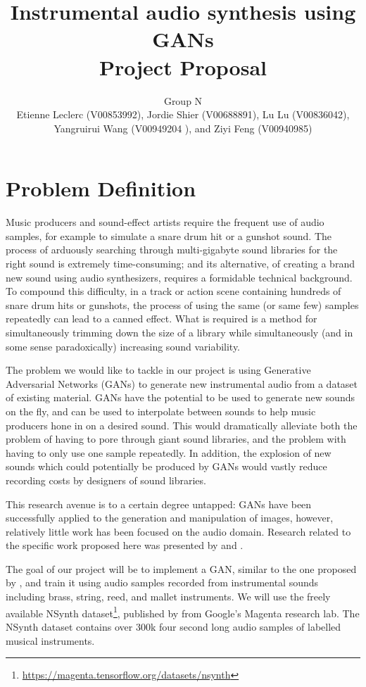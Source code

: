 \documentclass{article} %
\title{Instrumental audio synthesis using GANs \\ Project Proposal}
\author{Group N\\Etienne Leclerc (V00853992), Jordie Shier (V00688891), Lu Lu (V00836042),\\ Yangruirui Wang (V00949204
), and Ziyi Feng (V00940985)}
\begin{document}
\maketitle

\section{Problem Definition}
Music producers and sound-effect artists require the frequent use of audio samples, for example to simulate a snare drum hit or a gunshot sound. The process of arduously searching through multi-gigabyte sound libraries for the right sound is extremely time-consuming; and its alternative, of creating a brand new sound using audio synthesizers, requires a formidable technical background. To compound this difficulty, in a track or action scene containing hundreds of snare drum hits or gunshots, the process of using the same (or same few) samples repeatedly can lead to a canned effect. What is required is a method for simultaneously trimming down the size of a library while simultaneously (and in some sense paradoxically) increasing sound variability.

The problem we would like to tackle in our project is using Generative Adversarial Networks (GANs) \citep{goodfellow2014generative} to generate new instrumental audio from a dataset of existing material. GANs have the potential to be used to generate new sounds on the fly, and can be used to interpolate between sounds to help music producers hone in on a desired sound. This would dramatically alleviate both the problem of having to pore through giant sound libraries, and the problem with having to only use one sample repeatedly. In addition, the explosion of new sounds which could potentially be produced by GANs would vastly reduce recording costs by designers of sound libraries.

This research avenue is to a certain degree untapped: GANs have been successfully applied to the generation and manipulation of images, however, relatively little work has been focused on the audio domain. Research related to the specific work proposed here was presented by \citet{donahue2018adversarial}  and \citet{engel2018gansynth}.

The goal of our project will be to implement a GAN, similar to the one proposed by \citet{donahue2018adversarial}, and train it using audio samples recorded from instrumental sounds including brass, string, reed, and mallet instruments. We will use the freely available NSynth dataset\footnote{\url{https://magenta.tensorflow.org/datasets/nsynth}}, published by \citet{nsynth2017} from Google's Magenta research lab. The NSynth dataset contains over 300k four second long audio samples of labelled musical instruments.
\end{document}
